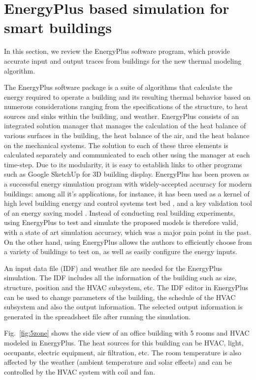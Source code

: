 \section{EnergyPlus based simulation for smart buildings}
\label{sec:energy_plus_review}
In this section, we review the EnergyPlus software program, which provide
accurate input and output traces from buildings for the new thermal
modeling algorithm.

The EnergyPlus software package is a suite of algorithms that calculate the
energy required to operate a building and its resulting thermal behavior based
on numerous considerations ranging from the specifications of the structure, to
heat sources and sinks within the building, and weather. EnergyPlus consists of
an integrated solution manager that manages the calculation of the heat balance
of various surfaces in the building, the heat balance of the air, and the heat
balance on the mechanical systems. The solution to each of these three elements
is calculated separately and communicated to each other using the manager at
each time-step. Due to its modularity, it is easy to establish links to other
programs such as Google SketchUp for 3D building display. EnergyPlus has been
proven as a successful energy simulation program with widely-accepted accuracy
for modern buildings: among all it's applications, for instance, it has been
used as a kernel of high level building energy and control systems test bed
\cite{wetter2011co}, and a key validation tool of an energy saving model
\cite{mardaljevic2009daylight}. Instead of conducting real building
experiments, using EnergyPlus to test and simulate the proposed models is
therefore valid, with a state of art simulation accuracy, which was a major
pain point in the past. On the other hand, using EnergyPlus allows the authors
to efficiently choose from a variety of buildings to test on, as well as easily
configure the energy inputs.

An input data file (IDF) and weather file are needed for the EnergyPlus
simulation. The IDF includes all the information of the building such
as size, structure, position and the HVAC subsystem, etc. The IDF
editor in EnergyPlus can be used to change parameters of the building, the
schedule of the HVAC subsystem and also the output information. The
selected output information is generated in the spreadsheet file
after running the simulation.

Fig.~\ref{fig:5zone} shows the side view of an office building
with 5 rooms and HVAC modeled in EnergyPlus. The heat sources for this building
can be HVAC, light, occupants, electric equipment, air filtration, etc. The
room temperature is also affected by the weather (ambient temperature and solar
effects) and can be controlled by the HVAC system with coil
and fan.


